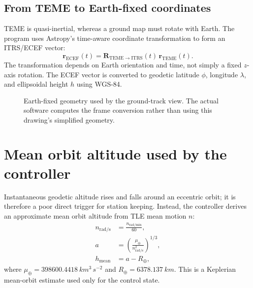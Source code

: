\documentclass[11pt,a4paper]{article}
\begin{document}
\subsection{From TEME to Earth-fixed coordinates}
TEME is quasi-inertial, whereas a ground map must rotate with Earth. The program uses Astropy's time-aware coordinate transformation to form an ITRS/ECEF vector:
\begin{equation}
  \mathbf r_{\mathrm{ECEF}}(t)=\mathbf R_{\mathrm{TEME}\rightarrow\mathrm{ITRS}}(t)\,\mathbf r_{\mathrm{TEME}}(t).
\end{equation}
The transformation depends on Earth orientation and time, not simply a fixed $z$-axis rotation. The ECEF vector is converted to geodetic latitude $\phi$, longitude $\lambda$, and ellipsoidal height $h$ using WGS-84.

\begin{figure}[h]
\centering
{}
\caption{Earth-fixed geometry used by the ground-track view. The actual software computes the frame conversion rather than using this drawing's simplified geometry.}
\end{figure}

\section{Mean orbit altitude used by the controller}
Instantaneous geodetic altitude rises and falls around an eccentric orbit; it is therefore a poor direct trigger for station keeping. Instead, the controller derives an approximate mean orbit altitude from TLE mean motion $n$:
\begin{align}
 n_{\mathrm{rad/s}} &= \frac{n_{\mathrm{rad/min}}}{60}, \\
 a &= \left(\frac{\mu_\oplus}{n_{\mathrm{rad/s}}^2}\right)^{1/3}, \\
 h_{\mathrm{mean}} &= a-R_\oplus,
\end{align}
where $\mu_\oplus=\SI{398600.4418}{km^3\,s^{-2}}$ and $R_\oplus=\SI{6378.137}{km}$. This is a Keplerian mean-orbit estimate used only for the control state.
\end{document}
